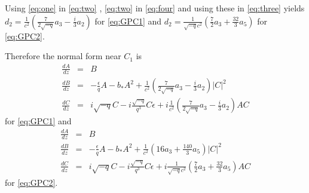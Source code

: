 Using \eqref{eq:one} in \eqref{eq:two} , \eqref{eq:two} in \eqref{eq:four} and using these in \eqref{eq:three} yields 
$ d_2 = \frac{1}{c^2}\left( \frac{7}{2 \sqrt{-q} } a_3 - \frac{i}{3} a_2 \right)$ for \eqref{eq:GPC1} and 
$ d_2 = \frac{1}{\sqrt{-q} c^2}\left( \frac{7}{2 } a_3 + \frac{32}{3} a_5 \right)$  for \eqref{eq:GPC2}. 

Therefore the normal form near $C_1$ is 
\begin{subequations}
\begin{eqnarray}
\frac{dA}{dz} &=& B \\ \label{eq:normalA}
\frac{dB}{dz} &=& -\frac{\epsilon}{q} A - b_* A^2 + \frac{1}{c^2}\left( \frac{7}{2 \sqrt{-q} } a_3 - \frac{i}{3} a_2 \right)  \left|C\right|^2 \\ \label{eq:normalB}
\frac{dC}{dz} &=& i \sqrt{-q} C - i \frac{\sqrt{-q} }{q^3} C\epsilon + i \frac{1}{c^2}\left( \frac{7}{2 \sqrt{-q} } a_3 - \frac{i}{3} a_2 \right)A C \label{eq:normalC}
\end{eqnarray}
\end{subequations}
for \eqref{eq:GPC1} and
\begin{subequations}
\begin{eqnarray}
\frac{dA}{dz} &=& B \\ \label{eq:normalA}
\frac{dB}{dz} &=& -\frac{\epsilon}{q} A - b_* A^2 + \frac{1}{c^2}\left( 16 a_3 + \frac{140}{3} a_5 \right)  \left|C\right|^2 \\ \label{eq:normalB}
\frac{dC}{dz} &=& i \sqrt{-q} C - i \frac{\sqrt{-q} }{q^3} C\epsilon + i \frac{1}{\sqrt{-q} c^2}\left( \frac{7}{2 } a_3 + \frac{32}{3} a_5 \right)A C \label{eq:normalC}
\end{eqnarray}
\end{subequations}
for \eqref{eq:GPC2}.

